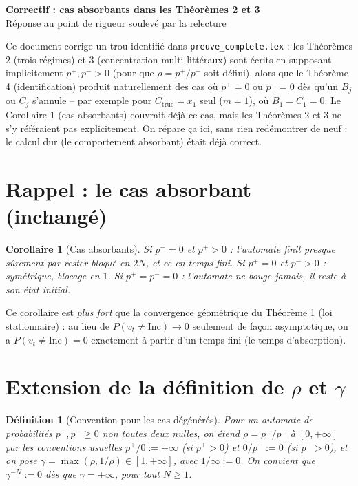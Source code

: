 \documentclass[11pt]{article}
\newtheorem{corollary}{Corollaire}
\newtheorem{definition}{Définition}
\theoremstyle{remark}
\newcommand{\Inc}{\ensuremath{\mathrm{Inc}}}
\begin{document}
\begin{center}
{\LARGE\bfseries Correctif : cas absorbants dans les Théorèmes 2 et 3}\\[4pt]
{\large Réponse au point de rigueur soulevé par la relecture}
\end{center}
\vspace{1em}

Ce document corrige un trou identifié dans \texttt{preuve\_complete.tex} :
les Théorèmes 2 (trois régimes) et 3 (concentration multi-littéraux) sont
écrits en supposant implicitement $p^+,p^->0$ (pour que $\rho=p^+/p^-$ soit
défini), alors que le Théorème 4 (identification) produit naturellement des
cas où $p^+=0$ ou $p^-=0$ dès qu'un $B_j$ ou $C_j$ s'annule -- par exemple
pour $C_{\mathrm{true}}=x_1$ seul ($m=1$), où $B_1=C_1=0$. Le Corollaire 1
(cas absorbants) couvrait déjà ce cas, mais les Théorèmes 2 et 3 ne s'y
référaient pas explicitement. On répare ça ici, sans rien redémontrer de
neuf : le calcul dur (le comportement absorbant) était déjà correct.

\section{Rappel : le cas absorbant (inchangé)}

\begin{corollary}[Cas absorbants]\label{cor:absorb}
Si $p^-=0$ et $p^+>0$ : l'automate finit presque sûrement par rester bloqué
en $2N$, et ce en temps fini. Si $p^+=0$ et $p^->0$ : symétrique, blocage en
$1$. Si $p^+=p^-=0$ : l'automate ne bouge jamais, il reste à son état
initial.
\end{corollary}

Ce corollaire est \emph{plus fort} que la convergence géométrique du
Théorème 1 (loi stationnaire) : au lieu de $P(v_t\ne\Inc)\to0$ seulement de
façon asymptotique, on a $P(v_t\ne\Inc)=0$ exactement à partir d'un temps
fini (le temps d'absorption).

\section{Extension de la définition de $\rho$ et $\gamma$}

\begin{definition}[Convention pour les cas dégénérés]\label{def:convention}
Pour un automate de probabilités $p^+,p^-\ge0$ non toutes deux nulles, on
étend $\rho=p^+/p^-$ à $[0,+\infty]$ par les conventions usuelles
$p^+/0:=+\infty$ (si $p^+>0$) et $0/p^-:=0$ (si $p^->0$), et on pose
$\gamma=\max(\rho,1/\rho)\in[1,+\infty]$, avec $1/\infty:=0$. On convient que
$\gamma^{-N}:=0$ dès que $\gamma=+\infty$, pour tout $N\ge1$.
\end{definition}
\end{document}
